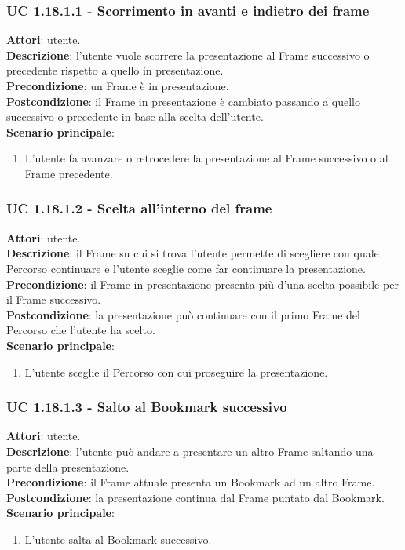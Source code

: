 	\subsubsection{UC 1.18.1.1 - Scorrimento in avanti e indietro dei frame}{
		\label{uc1.18.1.1}
		\textbf{Attori}: utente. \\
		\textbf{Descrizione}: l'utente vuole scorrere la presentazione al Frame successivo o precedente rispetto a quello in presentazione. \\
		\textbf{Precondizione}: un Frame è in presentazione.	\\
		\textbf{Postcondizione}: il Frame in presentazione è cambiato passando a quello successivo o precedente in base alla scelta dell'utente.\\
		\textbf{Scenario principale}:
		\begin{enumerate}
			\item L'utente fa avanzare o retrocedere la presentazione al Frame successivo o al Frame precedente.
		\end{enumerate}
	}
	\subsubsection{UC 1.18.1.2 - Scelta all'interno del frame}{
		\label{uc1.18.1.2}
		\textbf{Attori}: utente. \\
		\textbf{Descrizione}: il Frame su cui si trova l’utente permette di scegliere con quale Percorso continuare e l'utente sceglie come far continuare la presentazione. \\
		\textbf{Precondizione}: il Frame in presentazione presenta più d'una scelta possibile per il Frame successivo.	\\
		\textbf{Postcondizione}: la presentazione può continuare con il primo Frame del Percorso che l'utente ha scelto.\\
		\textbf{Scenario principale}:
		\begin{enumerate}
			\item L'utente sceglie il Percorso con cui proseguire la presentazione.
		\end{enumerate}
	}
	\subsubsection{UC 1.18.1.3 - Salto al Bookmark successivo}{
		\label{uc1.18.1.3}
		\textbf{Attori}: utente. \\
		\textbf{Descrizione}: l'utente può andare a presentare un altro Frame saltando una parte della presentazione. \\
		\textbf{Precondizione}: il Frame attuale presenta un Bookmark ad un altro Frame.	\\
		\textbf{Postcondizione}: la presentazione continua dal Frame puntato dal Bookmark.	\\
		\textbf{Scenario principale}:
		\begin{enumerate}
			\item L'utente salta al Bookmark successivo.
		\end{enumerate}
	}
